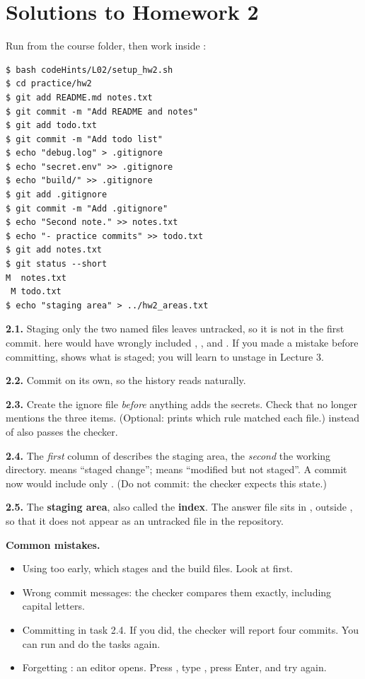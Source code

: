 \section*{Solutions to Homework 2}

Run from the course folder, then work inside :

\begin{lstlisting}
$ bash codeHints/L02/setup_hw2.sh
$ cd practice/hw2
$ git add README.md notes.txt
$ git commit -m "Add README and notes"
$ git add todo.txt
$ git commit -m "Add todo list"
$ echo "debug.log" > .gitignore
$ echo "secret.env" >> .gitignore
$ echo "build/" >> .gitignore
$ git add .gitignore
$ git commit -m "Add .gitignore"
$ echo "Second note." >> notes.txt
$ echo "- practice commits" >> todo.txt
$ git add notes.txt
$ git status --short
M  notes.txt
 M todo.txt
$ echo "staging area" > ../hw2_areas.txt
\end{lstlisting}

\textbf{2.1.} Staging only the two named files leaves  untracked, so it is not in the first commit.  here would have wrongly included , ,  and . If you made a mistake before committing,  shows what is staged; you will learn to unstage in Lecture 3.

\textbf{2.2.} Commit  on its own, so the history reads naturally.

\textbf{2.3.} Create the ignore file \emph{before} anything adds the secrets. Check that  no longer mentions the three items. (Optional:  prints which rule matched each file.)  instead of  also passes the checker.

\textbf{2.4.} The \emph{first} column of  describes the staging area, the \emph{second} the working directory.  means ``staged change'';  means ``modified but not staged''. A commit now would include only . (Do not commit: the checker expects this state.)

\textbf{2.5.} The \textbf{staging area}, also called the \textbf{index}. The answer file sits in , outside , so that it does not appear as an untracked file in the repository.

\textbf{Common mistakes.}
\begin{itemize}
  \item Using  too early, which stages  and the build files. Look at  first.
  \item Wrong commit messages: the checker compares them exactly, including capital letters.
  \item Committing in task 2.4. If you did, the checker will report four commits. You can run  and do the tasks again.
  \item Forgetting : an editor opens. Press , type , press Enter, and try again.
\end{itemize}
